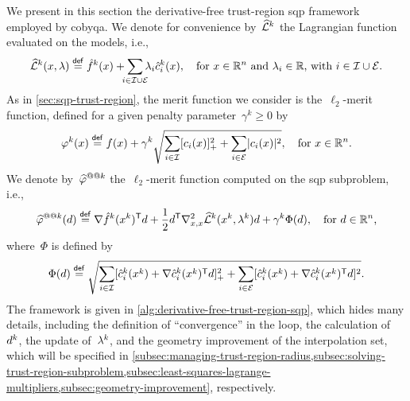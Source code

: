 We present in this section the derivative-free trust-region \gls{sqp} framework employed by \gls{cobyqa}.
We denote for convenience by~$\lagm[k]$ the Lagrangian function evaluated on the models, i.e.,
\begin{equation*}
    \lagm[k](\iter, \lm) \eqdef \objm[k](\iter) + \sum_{\mathclap{i \in \iub \cup \ieq}} \lm_i \conm[k]{i}(\iter), \quad \text{for~$\iter \in \R^n$ and~$\lm_i \in \R$, with~$i \in \iub \cup \ieq$.}
\end{equation*}
As in \cref{sec:sqp-trust-region}, the merit function we consider is the~$\ell_2$-merit function, defined for a given penalty parameter~$\gamma^k \ge 0$ by
\begin{equation*}
    \merit[k](\iter) \eqdef \obj(x) + \gamma^k \sqrt{\sum_{i \in \iub} \posp{\con{i}(\iter)}^2 + \sum_{i \in \ieq} \abs{\con{i}(\iter)}^2}, \quad \text{for~$\iter \in \R^n$.}
\end{equation*}
We denote by~$\meritm[k]$ the~$\ell_2$-merit function computed on the \gls{sqp} subproblem, i.e.,
\begin{equation}
    \label{eq:l2-merit-function-model}
    \meritm[k](\step) \eqdef \nabla \objm[k](\iter[k])^{\T} \step + \frac{1}{2} \step^{\T} \nabla_{x, x}^2 \lagm[k](\iter[k], \lm[k]) \step + \gamma^k \Phi(\step), \quad \text{for~$\step \in \R^n$,}
\end{equation}
where~$\Phi$ is defined by
\begin{equation}
    \label{eq:l2-merit-function-model-penalty}
    \Phi(d) \eqdef \sqrt{\sum_{i \in \iub} \posp{\conm[k]{i}(\iter[k]) + \nabla \conm[k]{i}(\iter[k])^{\T} \step}^2 + \sum_{i \in \ieq} [\conm[k]{i}(\iter[k]) + \nabla \conm[k]{i}(\iter[k])^{\T} \step]^2}.
\end{equation}
The framework is given in \cref{alg:derivative-free-trust-region-sqp}, which hides many details, including the definition of \enquote{convergence} in the loop, the calculation of~$\step[k]$, the update of~$\lm[k]$, and the geometry improvement of the interpolation set, which will be specified in \cref{subsec:managing-trust-region-radius,subsec:solving-trust-region-subproblem,subsec:least-squares-lagrange-multipliers,subsec:geometry-improvement}, respectively.

